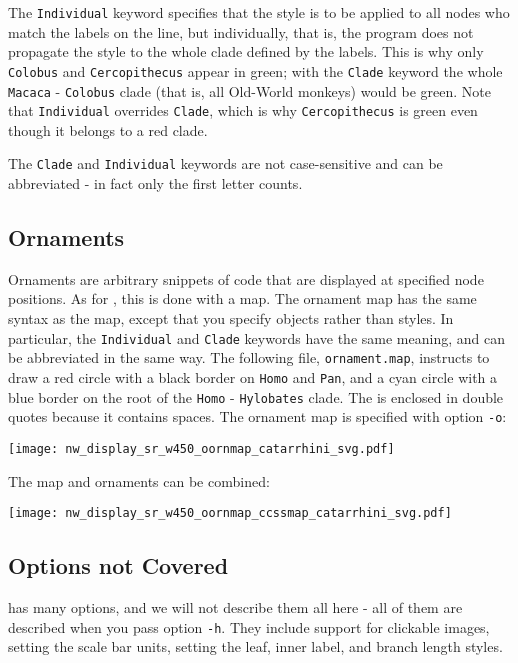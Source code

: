 The \texttt{Individual} keyword specifies that the style is to be applied to all nodes who match the labels on the line, but individually, that is, the program does not propagate the style to the whole clade defined by the labels. This is why only \texttt{Colobus} and \texttt{Cercopithecus} appear in green; with the \texttt{Clade} keyword the whole \texttt{Macaca} - \texttt{Colobus} clade (that is, all Old-World monkeys) would be green. Note that \texttt{Individual} overrides \texttt{Clade}, which is why \texttt{Cercopithecus} is green even though it belongs to a red clade.

The \texttt{Clade} and \texttt{Individual} keywords are not case-sensitive and can be abbreviated - in fact only the first letter counts.

\subsection{Ornaments}

Ornaments are arbitrary snippets of \svg{} code that are displayed at specified
node positions. As for \css, this is done with a map. The ornament map has the
same syntax as the \css{} map, except that you specify \svg{} objects rather
than \css{} styles. In particular, the \texttt{Individual} and \texttt{Clade}
keywords have the same meaning, and can be abbreviated in the same way. The
following file, \texttt{ornament.map}, instructs to draw a red circle with a
black border on \texttt{Homo} and \texttt{Pan}, and a cyan circle with a blue
border on the root of the \texttt{Homo} - \texttt{Hylobates} clade. The \svg{} is enclosed in double quotes because it contains spaces. The
ornament map is specified with option \texttt{-o}:
				
\begin{quote}
 
\end{quote}



\begin{center}
 \texttt{[image: nw\_display\_sr\_w450\_oornmap\_catarrhini\_svg.pdf]}
\end{center}

\noindent{}The \css{} map and ornaments can be combined:



\begin{center}
 \texttt{[image: nw\_display\_sr\_w450\_oornmap\_ccssmap\_catarrhini\_svg.pdf]}
\end{center}

\subsection{Options not Covered}

\display{} has many options, and we will not describe them all here - all of them are described when you pass option \texttt{-h}. They include support for clickable images, setting the scale bar units, setting the leaf, inner label, and branch length styles.
